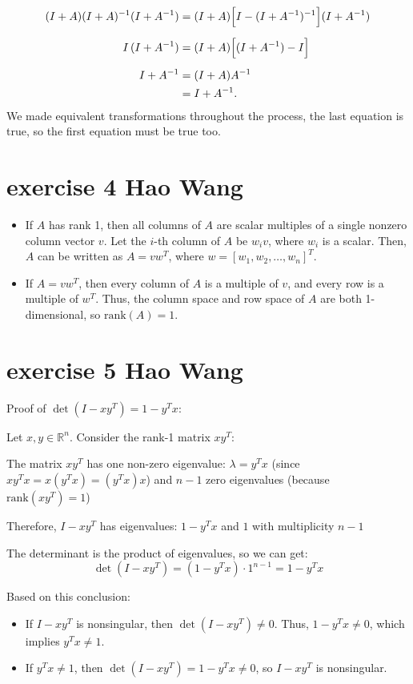 \documentclass{article}
\begin{document}
\begin{align*}
    (I+A)(I+A)^{-1}(I+A^{-1})
     & = (I+A)\Bigl[I-(I+A^{-1})^{-1}\Bigr](I+A^{-1}) \\[2mm]
    I\,(I+A^{-1})
     & = (I+A)\Bigl[(I+A^{-1})-I\Bigr]                \\[2mm]
    I+A^{-1}
     & = (I+A)A^{-1}                                  \\
     & = I+A^{-1}.
\end{align*}
We made equivalent transformations throughout the process, the last equation is true, so the first equation must be true too.

\section{exercise 4 Hao Wang}

\begin{itemize}
    \item If \( A \) has rank 1, then all columns of \( A \) are scalar multiples of a single nonzero column vector \( v \). Let the \( i \)-th column of \( A \) be \( w_i v \), where \( w_i \) is a scalar. Then, \( A \) can be written as \( A = vw^T \), where \( w = [w_1, w_2, \dots, w_n]^T \).

    \item If \( A = vw^T \), then every column of \( A \) is a multiple of \( v \), and every row is a multiple of \( w^T \). Thus, the column space and row space of \( A \) are both 1-dimensional, so \( \text{rank}(A) = 1 \).
\end{itemize}

\section{exercise 5 Hao Wang}

Proof of $\det(I - xy^T) = 1 - y^T x$:

Let $x, y \in \mathbb{R}^n$. Consider the rank-1 matrix $xy^T$:

The matrix $xy^T$ has one non-zero eigenvalue: $\lambda = y^T x$ (since $xy^T x = x(y^T x) = (y^T x)x$) and $n-1$ zero eigenvalues (because $\text{rank}(xy^T) = 1$)

Therefore, $I - xy^T$ has eigenvalues: $1 - y^T x$ and $1$ with multiplicity $n-1$

The determinant is the product of eigenvalues, so we can get:
\[
    \det(I - xy^T) = (1 - y^T x) \cdot 1^{n-1} = 1 - y^T x
\]

Based on this conclusion:
\begin{itemize}
    \item If \( I - xy^T \) is nonsingular, then \( \det(I - xy^T) \neq 0 \). Thus, \( 1 - y^T x \neq 0 \), which implies \( y^T x \neq 1 \).

    \item  If \( y^T x \neq 1 \), then \( \det(I - xy^T) = 1 - y^T x \neq 0 \), so \( I - xy^T \) is nonsingular.
\end{itemize}
\end{document}
